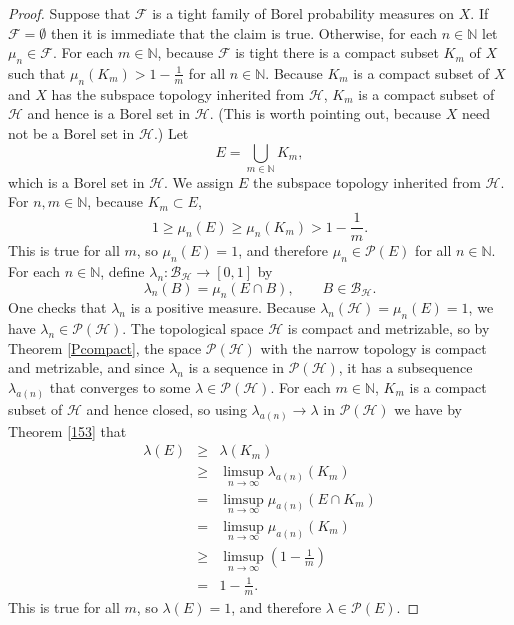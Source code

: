 \documentclass{article}
\theoremstyle{definition}
\begin{document}
\begin{proof}
Suppose that $\mathscr{F}$ is a tight family of Borel probability measures on $X$. If $\mathscr{F}= \emptyset$ then it is immediate that the claim is true. Otherwise, for
each $n \in \mathbb{N}$ let $\mu_n \in \mathscr{F}$. 
For each $m \in \mathbb{N}$, because $\mathscr{F}$ is tight there is a compact subset $K_m$ of $X$
such that $\mu_n(K_m)>1-\frac{1}{m}$ for all $n \in \mathbb{N}$. Because $K_m$ is a compact subset of $X$ and $X$ has the subspace topology inherited from $\mathscr{H}$,
$K_m$ is a compact subset of $\mathscr{H}$ and hence is a Borel set in $\mathscr{H}$. (This is worth pointing out, because $X$ need not be a Borel set in $\mathscr{H}$.)
Let 
\[
E = \bigcup_{m \in \mathbb{N}} K_m,
\]
 which is a Borel set in $\mathscr{H}$. We assign $E$ the subspace topology inherited from $\mathscr{H}$. 
For $n,m \in \mathbb{N}$, because $K_m \subset E$,
\[
1 \geq \mu_n(E) \geq \mu_n(K_m) > 1-\frac{1}{m}.
\]
This is true for all $m$, so $\mu_n(E) = 1$, and therefore $\mu_n \in \mathscr{P}(E)$ for all $n \in \mathbb{N}$.
For each $n \in \mathbb{N}$, define $\lambda_n:\mathscr{B}_\mathscr{H} \to [0,1]$ by
\[
\lambda_n(B) = \mu_n(E \cap B), \qquad B \in \mathscr{B}_\mathscr{H}.
\]
One checks that $\lambda_n$ is a positive measure. 
Because $\lambda_n(\mathscr{H})  = \mu_n(E) = 1$, 
we have $\lambda_n \in \mathscr{P}(\mathscr{H})$. 
The topological space $\mathscr{H}$ is compact and metrizable, so 
by Theorem \ref{Pcompact}, the space $\mathscr{P}(\mathscr{H})$ with the narrow topology is compact and metrizable, 
and since $\lambda_n$ is a sequence in $\mathscr{P}(\mathscr{H})$, it has a subsequence 
$\lambda_{a(n)}$ that converges to some $\lambda \in \mathscr{P}(\mathscr{H})$.
For each $m \in \mathbb{N}$, $K_m$ is a compact subset of $\mathscr{H}$ and hence closed, so using 
$\lambda_{a(n)} \to \lambda$ in $\mathscr{P}(\mathscr{H})$ we have by Theorem \ref{153} that
\begin{eqnarray*}
\lambda(E) &\geq& \lambda(K_m)\\
& \geq& \limsup_{n \to \infty} \lambda_{a(n)}(K_m)\\
& =& \limsup_{n \to \infty} \mu_{a(n)} (E \cap K_m)\\
&=& \limsup_{n \to \infty} \mu_{a(n)}(K_m)\\
& \geq& \limsup_{n \to \infty} \left(1-\frac{1}{m} \right)\\
&=&1-\frac{1}{m}.
\end{eqnarray*}
This is true for all $m$, so $\lambda(E)=1$, and therefore $\lambda \in \mathscr{P}(E)$. 



\end{proof}
\end{document}
